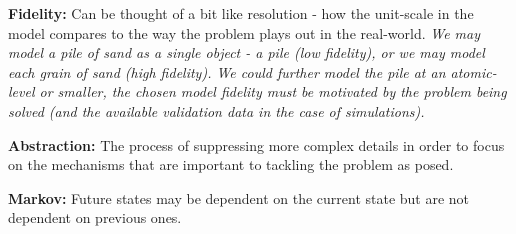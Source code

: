 \noindent \textbf{Fidelity:} Can be thought of a bit like resolution - how the unit-scale in the
model compares to the way the problem plays out in the real-world.  \textit{We may
model a pile of sand as a single object - a pile (low fidelity), or we may
model each grain of sand (high fidelity). We could further model the pile at an
atomic-level or smaller, the chosen model fidelity must be motivated by the
problem being solved (and the available validation data in the case of
simulations).}

\noindent \textbf{Abstraction:} The process of suppressing more complex details in order to focus
on the mechanisms that are important to tackling the problem as posed.

\noindent \textbf{Markov:} Future states may be dependent on the current state but are not
dependent on previous ones.

